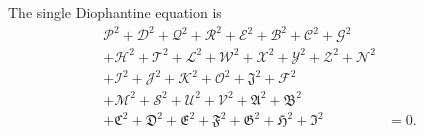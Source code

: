The single Diophantine equation is
\[
\begin{split}
\mathcal{P}^2+\mathcal{D}^2+\mathcal{Q}^2+\mathcal{R}^2+\mathcal{E}^2+\mathcal{B}^2+\mathcal{C}^2+\mathcal{G}^2 &\\
+\mathcal{H}^2+\mathcal{T}^2+\mathcal{L}^2+\mathcal{W}^2+\mathcal{X}^2+\mathcal{Y}^2+\mathcal{Z}^2+\mathcal{N}^2 &\\
+\mathcal{I}^2+\mathcal{J}^2+\mathcal{K}^2+\mathcal{O}^2+\mathfrak{J}^2+\mathcal{F}^2 &\\
+\mathcal{M}^2+\mathcal{S}^2+\mathcal{U}^2+\mathcal{V}^2+\mathfrak{A}^2+\mathfrak{B}^2 &\\
+\mathfrak{C}^2+\mathfrak{D}^2+\mathfrak{E}^2+\mathfrak{F}^2+\mathfrak{G}^2+\mathfrak{H}^2+\mathfrak{I}^2 &= 0.
\end{split}
\]
